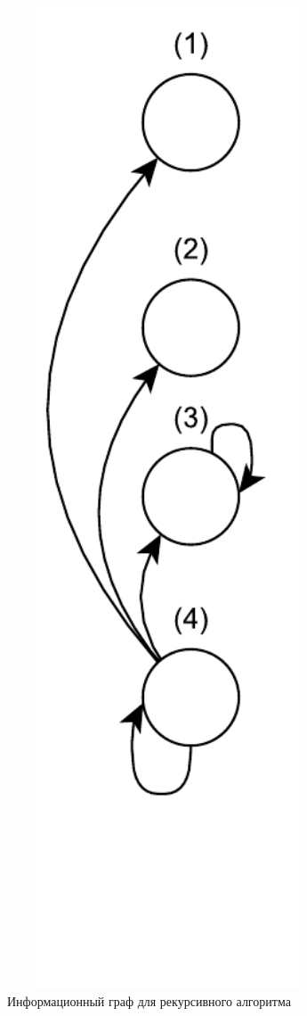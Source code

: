 \begin{figure}[H]
	\centering
	\includegraphics[width=0.85\textwidth,height=0.5\textheight,keepaspectratio]{images/recursive_info_graph}
	\caption{Информационный граф для рекурсивного алгоритма}
	\label{recursive_info_graph}
\end{figure}

